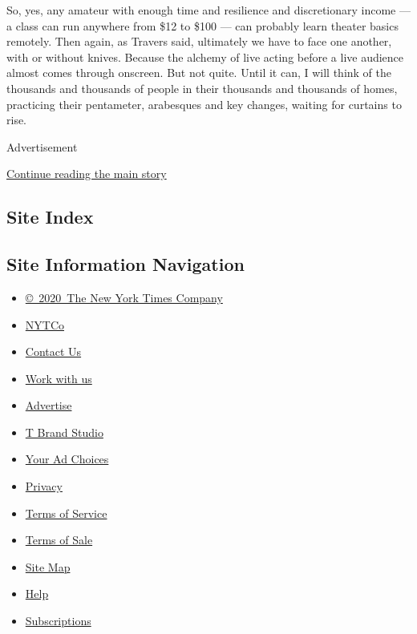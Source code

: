 So, yes, any amateur with enough time and resilience and discretionary
income --- a class can run anywhere from \$12 to \$100 --- can probably
learn theater basics remotely. Then again, as Travers said, ultimately
we have to face one another, with or without knives. Because the alchemy
of live acting before a live audience almost comes through onscreen. But
not quite. Until it can, I will think of the thousands and thousands of
people in their thousands and thousands of homes, practicing their
pentameter, arabesques and key changes, waiting for curtains to rise.

Advertisement

\protect\hyperlink{after-bottom}{Continue reading the main story}

\hypertarget{site-index}{%
\subsection{Site Index}\label{site-index}}

\hypertarget{site-information-navigation}{%
\subsection{Site Information
Navigation}\label{site-information-navigation}}

\begin{itemize}
\tightlist
\item
  \href{https://help.nytimes3xbfgragh.onion/hc/en-us/articles/115014792127-Copyright-notice}{©~2020~The
  New York Times Company}
\end{itemize}

\begin{itemize}
\tightlist
\item
  \href{https://www.nytco.com/}{NYTCo}
\item
  \href{https://help.nytimes3xbfgragh.onion/hc/en-us/articles/115015385887-Contact-Us}{Contact
  Us}
\item
  \href{https://www.nytco.com/careers/}{Work with us}
\item
  \href{https://nytmediakit.com/}{Advertise}
\item
  \href{http://www.tbrandstudio.com/}{T Brand Studio}
\item
  \href{https://www.nytimes3xbfgragh.onion/privacy/cookie-policy\#how-do-i-manage-trackers}{Your
  Ad Choices}
\item
  \href{https://www.nytimes3xbfgragh.onion/privacy}{Privacy}
\item
  \href{https://help.nytimes3xbfgragh.onion/hc/en-us/articles/115014893428-Terms-of-service}{Terms
  of Service}
\item
  \href{https://help.nytimes3xbfgragh.onion/hc/en-us/articles/115014893968-Terms-of-sale}{Terms
  of Sale}
\item
  \href{https://spiderbites.nytimes3xbfgragh.onion}{Site Map}
\item
  \href{https://help.nytimes3xbfgragh.onion/hc/en-us}{Help}
\item
  \href{https://www.nytimes3xbfgragh.onion/subscription?campaignId=37WXW}{Subscriptions}
\end{itemize}
